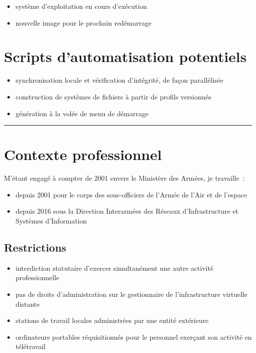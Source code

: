 \documentclass[10pt]{article}
\newcommand{\hr}{\rule{\textwidth}{1pt}}
\newenvironment{itmz}{\begin{itemize}
\setlength{\itemsep}{0em}
}{\end{itemize}}
\begin{document}
\begin{itmz}
\item{système d’exploitation en cours d’exécution}
\item{nouvelle image pour le prochain redémarrage}
\end{itmz}

\section{Scripts d’automatisation potentiels}

\begin{itmz}
\item{synchronisation locale et vérification d’intégrité, de façon parallélisée}
\item{construction de systèmes de fichiers à partir de profils versionnés}
\item{génération à la volée de menu de démarrage}
\end{itmz}

\hr

\appendix

\section{Contexte professionnel}

M’étant engagé à compter de 2001 envers le Ministère des Armées, je travaille :
\begin{itmz}
\item{depuis 2001 pour le corps des sous-officiers de l’Armée de l’Air et de l’espace}
\item{depuis 2016 sous la Direction Interarmées des Réseaux d’Infrastructure et Systèmes d’Information}
\end{itmz}

\subsection{Restrictions}

\begin{itmz}
\item{interdiction statutaire d’exercer simultanément une autre activité professionnelle}
\item{pas de droits d’administration sur le gestionnaire de l’infrastructure virtuelle distante}
\item{stations de travail locales administrées par une entité extérieure}
\item{ordinateurs portables réquisitionnés pour le personnel exerçant son activité en télétravail}
\end{itmz}
\end{document}

